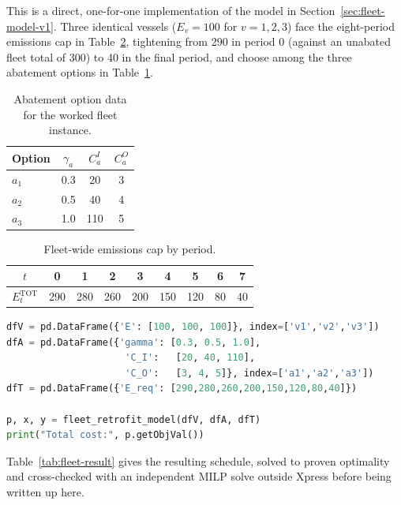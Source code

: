 This is a direct, one-for-one implementation of the model in
Section~\ref{sec:fleet-model-v1}. Three identical
vessels ($E_v=100$ for $v=1,2,3$) face the eight-period emissions cap in
Table~\ref{tab:fleet-cap}, tightening from 290 in period 0 (against an
unabated fleet total of 300) to 40 in the final period, and choose among
the three abatement options in Table~\ref{tab:fleet-options}.

\begin{table}[htbp]
\centering
\caption{Abatement option data for the worked fleet instance.}
\label{tab:fleet-options}
\begin{tabular}{@{}lccc@{}}
\toprule
Option & $\gamma_a$ & $C_a^I$ & $C_a^O$ \\
\midrule
$a_1$ & 0.3 & 20 & 3 \\
$a_2$ & 0.5 & 40 & 4 \\
$a_3$ & 1.0 & 110 & 5 \\
\bottomrule
\end{tabular}
\end{table}

\begin{table}[htbp]
\centering
\caption{Fleet-wide emissions cap by period.}
\label{tab:fleet-cap}
\begin{tabular}{@{}ccccccccc@{}}
\toprule
$t$ & 0 & 1 & 2 & 3 & 4 & 5 & 6 & 7 \\
\midrule
$E_t^{\text{TOT}}$ & 290 & 280 & 260 & 200 & 150 & 120 & 80 & 40 \\
\bottomrule
\end{tabular}
\end{table}

\begin{lstlisting}[language=Python]
dfV = pd.DataFrame({'E': [100, 100, 100]}, index=['v1','v2','v3'])
dfA = pd.DataFrame({'gamma': [0.3, 0.5, 1.0],
                     'C_I':   [20, 40, 110],
                     'C_O':   [3, 4, 5]}, index=['a1','a2','a3'])
dfT = pd.DataFrame({'E_req': [290,280,260,200,150,120,80,40]})

p, x, y = fleet_retrofit_model(dfV, dfA, dfT)
print("Total cost:", p.getObjVal())
\end{lstlisting}

Table~\ref{tab:fleet-result} gives the resulting schedule, solved to
proven optimality and cross-checked with an independent MILP solve
outside Xpress before being written up here.


